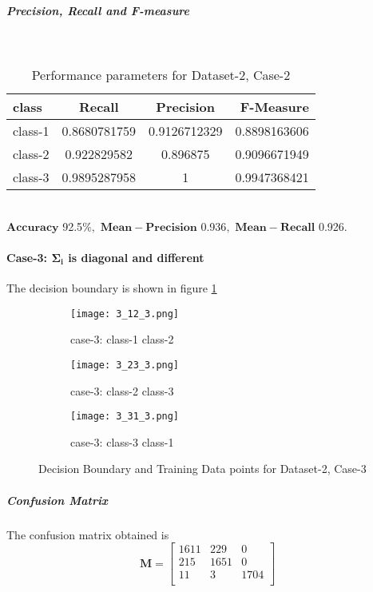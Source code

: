 \documentclass[a4paper]{article}
\begin{document}
\subparagraph{Precision, Recall and F-measure} \textcolor{white}{:}
\begin{table}[h!]
  \begin{center}
    \caption{Performance parameters for Dataset-2, Case-2}
    \label{tab:table1}
    \begin{tabular}{l|c|c|r} %
      \textbf{class} & \textbf{Recall} & \textbf{Precision} & \textbf{F-Measure}\\
      \hline
      class-1 & 0.8680781759 & 0.9126712329 & 0.8898163606\\
      class-2 & 0.922829582 & 0.896875 & 0.9096671949\\
      class-3 & 0.9895287958 & 1 & 0.9947368421\\
    \end{tabular}
  \end{center}
\end{table}
\\$\mathbf{Accuracy}$ 92.5$\%,$ $\mathbf{Mean -Precision}$ 0.936$,$ $\mathbf{Mean -Recall}$ 0.926$.$
\newpage
\paragraph{Case-3: $\mathbf{\Sigma_{i}}$ is diagonal and different}
The decision boundary is shown in figure \ref{fig:3_3}
\begin{figure}[h!]
  \centering
  \begin{subfigure}[b]{0.4\linewidth}
    \texttt{[image: 3\_12\_3.png]}
     \caption{case-3: class-1 class-2}
  \end{subfigure}
  \begin{subfigure}[b]{0.4\linewidth}
    \texttt{[image: 3\_23\_3.png]}
    \caption{case-3: class-2 class-3}
  \end{subfigure}
  \begin{subfigure}[b]{0.4\linewidth}
    \texttt{[image: 3\_31\_3.png]}
    \caption{case-3: class-3 class-1}
  \end{subfigure}
  \caption{Decision Boundary and Training Data points for Dataset-2, Case-3}
  \label{fig:3_3}
\end{figure}
\subparagraph{Confusion Matrix}
The confusion matrix obtained is
\[
\mathbf{M} = \left[ {\begin{array}{ccc}
1611 & 229 & 0\\
215 & 1651 & 0\\
11 & 3 & 1704\\
\end{array}} \right]
\]
\\
\end{document}

